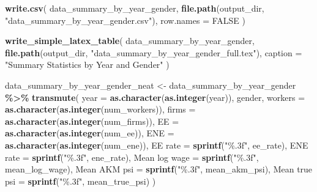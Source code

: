 \documentclass[
]{article}
\newenvironment{Shaded}{\begin{snugshade}}{\end{snugshade}}
\newcommand{\AttributeTok}[1]{\textcolor[rgb]{0.13,0.29,0.53}{#1}}
\newcommand{\ConstantTok}[1]{\textcolor[rgb]{0.56,0.35,0.01}{#1}}
\newcommand{\FunctionTok}[1]{\textcolor[rgb]{0.13,0.29,0.53}{\textbf{#1}}}
\newcommand{\NormalTok}[1]{#1}
\newcommand{\OtherTok}[1]{\textcolor[rgb]{0.56,0.35,0.01}{#1}}
\newcommand{\SpecialCharTok}[1]{\textcolor[rgb]{0.81,0.36,0.00}{\textbf{#1}}}
\newcommand{\StringTok}[1]{\textcolor[rgb]{0.31,0.60,0.02}{#1}}
\begin{document}
\begin{Shaded}
\begin{Highlighting}[]
\FunctionTok{write.csv}\NormalTok{(}
\NormalTok{    data\_summary\_by\_year\_gender,}
    \FunctionTok{file.path}\NormalTok{(output\_dir, }\StringTok{"data\_summary\_by\_year\_gender.csv"}\NormalTok{),}
    \AttributeTok{row.names =} \ConstantTok{FALSE}
\NormalTok{)}

\FunctionTok{write\_simple\_latex\_table}\NormalTok{(}
\NormalTok{    data\_summary\_by\_year\_gender,}
    \FunctionTok{file.path}\NormalTok{(output\_dir, }\StringTok{"data\_summary\_by\_year\_gender\_full.tex"}\NormalTok{),}
    \AttributeTok{caption =} \StringTok{"Summary Statistics by Year and Gender"}
\NormalTok{)}

\NormalTok{data\_summary\_by\_year\_gender\_neat }\OtherTok{\textless{}{-}}\NormalTok{ data\_summary\_by\_year\_gender }\SpecialCharTok{\%\textgreater{}\%}
    \FunctionTok{transmute}\NormalTok{(}
        \AttributeTok{year =} \FunctionTok{as.character}\NormalTok{(}\FunctionTok{as.integer}\NormalTok{(year)),}
\NormalTok{        gender,}
        \AttributeTok{workers =} \FunctionTok{as.character}\NormalTok{(}\FunctionTok{as.integer}\NormalTok{(num\_workers)),}
        \AttributeTok{firms =} \FunctionTok{as.character}\NormalTok{(}\FunctionTok{as.integer}\NormalTok{(num\_firms)),}
        \AttributeTok{EE =} \FunctionTok{as.character}\NormalTok{(}\FunctionTok{as.integer}\NormalTok{(num\_ee)),}
        \AttributeTok{ENE =} \FunctionTok{as.character}\NormalTok{(}\FunctionTok{as.integer}\NormalTok{(num\_ene)),}
        \StringTok{\textasciigrave{}}\AttributeTok{EE rate}\StringTok{\textasciigrave{}} \OtherTok{=} \FunctionTok{sprintf}\NormalTok{(}\StringTok{"\%.3f"}\NormalTok{, ee\_rate),}
        \StringTok{\textasciigrave{}}\AttributeTok{ENE rate}\StringTok{\textasciigrave{}} \OtherTok{=} \FunctionTok{sprintf}\NormalTok{(}\StringTok{"\%.3f"}\NormalTok{, ene\_rate),}
        \StringTok{\textasciigrave{}}\AttributeTok{Mean log wage}\StringTok{\textasciigrave{}} \OtherTok{=} \FunctionTok{sprintf}\NormalTok{(}\StringTok{"\%.3f"}\NormalTok{, mean\_log\_wage),}
        \StringTok{\textasciigrave{}}\AttributeTok{Mean AKM psi}\StringTok{\textasciigrave{}} \OtherTok{=} \FunctionTok{sprintf}\NormalTok{(}\StringTok{"\%.3f"}\NormalTok{, mean\_akm\_psi),}
        \StringTok{\textasciigrave{}}\AttributeTok{Mean true psi}\StringTok{\textasciigrave{}} \OtherTok{=} \FunctionTok{sprintf}\NormalTok{(}\StringTok{"\%.3f"}\NormalTok{, mean\_true\_psi)}
\NormalTok{    )}


\end{Highlighting}
\end{Shaded}
\end{document}
